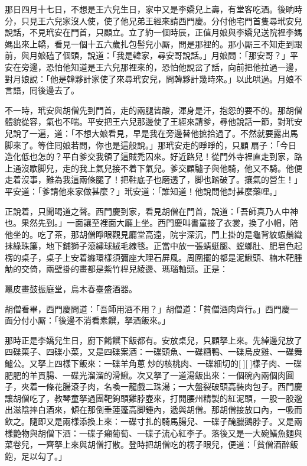 那日四月十七日，不想是王六兒生日，家中又是李嬌兒上壽，有堂客吃酒。後晌時分，只見王六兒家沒人使，使了他兄弟王經來請西門慶。分付他宅門首隻尋玳安兒說話，不見玳安在門首，只顧立。立了約一個時辰，正值月娘與李嬌兒送院裡李媽媽出來上轎，看見一個十五六歲扎包髻兒小厮，問是那裡的。那小厮三不知走到跟前，與月娘磕了個頭，說道：「我是韓家，尋安哥說話。」月娘問：「那安哥？」平安在旁邊，恐怕他知道是王六兒那裡來的，恐怕他說岔了話，向前把他拉過一邊，對月娘說：「他是韓夥計家使了來尋玳安兒，問韓夥計幾時來。」以此哄過。月娘不言語，囘後邊去了。

不一時，玳安與胡僧先到門首，走的兩腿皆酸，渾身是汗，抱怨的要不的。那胡僧體貌從容，氣也不喘。平安把王六兒那邊使了王經來請爹，尋他說話一節，對玳安兒說了一遍，道：「不想大娘看見，早是我在旁邊替他摭拾過了。不然就要露出馬脚來了。等住囘娘若問，你也是這般說。」那玳安走的睜睜的，只顧𢵞扇子：「今日造化低也怎的？平白爹交我領了這賊禿囚來。好近路兒！從門外寺裡直走到家，路上通沒歇脚兒，走的我上氣兒接不着下氣兒。爹交顧驢子與他騎，他又不騎。他便走着沒事，難為我這兩條腿了！把鞋底子也磨透了，脚也踏破了。攘氣的營生！」平安道：「爹請他來家做甚麼？」玳安道：「誰知道！他說問他討甚麼藥哩。」

正說着，只聞喝道之聲。西門慶到家，看見胡僧在門首，說道：「吾師真乃人中神也。果然先到。」一面讓至裡面大廳上坐。西門慶叫書童接了衣裳，換了小帽，陪他坐的。吃了茶，那胡僧睜眼觀見廳堂高遠，院宇深沉，門上掛的是龜背紋蝦鬚織抹綠珠簾，地下鋪獅子滾繡球絨毛線毯。正當中放一張蜻蜓腿、螳螂肚、肥皂色起楞的桌子，桌子上安着縧環樣須彌座大理石屏風。周圍擺的都是泥鰍頭、楠木靶腫觔的交倚，兩壁掛的畫都是紫竹桿兒綾邊、瑪瑙軸頭。{}正是：

鼉皮畫鼓振庭堂，烏木春臺盛酒器。

胡僧看畢，西門慶問道：「吾師用酒不用？」胡僧道：「貧僧酒肉齊行。」西門慶一面分付小厮：「後邊不消看素饌，拏酒飯來。」

那時正是李嬌兒生日，廚下餚饌下飯都有。安放桌兒，只顧拏上來。先綽邊兒放了四碟菓子、四碟小菜，又是四碟案酒：一碟頭魚、一碟糟鴨、一碟烏皮雞、一碟舞鱸公。又拏上四樣下飯來：一碟羊角蔥𤆑炒的核桃肉、一碟細切的[][]樣子肉、一碟肥肥的羊貫腸、一碟光溜溜的滑鰍。次又拏了一道湯飯出來：一個碗內兩個肉圓子，夾着一條花腸滾子肉，名喚一龍戲二珠湯；一大盤裂破頭高裝肉包子。西門慶讓胡僧吃了，教琴童拏過團靶鉤頭雞脖壺來，打開腰州精製的紅泥頭，一股一股邈出滋陰摔白酒來，傾在那倒垂蓮蓬高脚鍾內，遞與胡僧。那胡僧接放口內，一吸而飲之。隨即又是兩樣添換上來：一碟寸扎的騎馬腸兒、一碟子醃臘鵝脖子。又是兩樣艷物與胡僧下酒：一碟子癩葡萄、一碟子流心紅李子。落後又是一大碗鱔魚麵與菜卷兒，一齊拏上來與胡僧打散。登時把胡僧吃的楞子眼兒，便道：「貧僧酒醉飯飽，足以勾了。」


